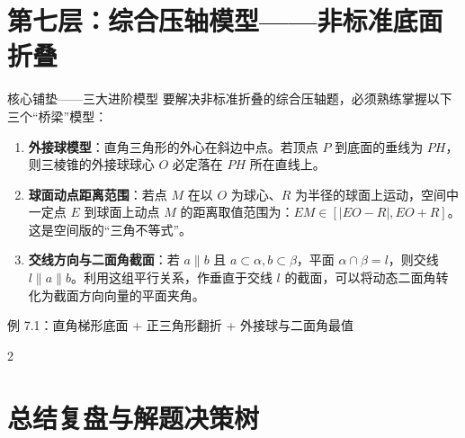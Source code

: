 \documentclass[11pt,a4paper]{ctexart}
\begin{document}
\newpage

\section{第七层：综合压轴模型——非标准底面折叠}

\begin{keybox}{核心铺垫——三大进阶模型}
要解决非标准折叠的综合压轴题，必须熟练掌握以下三个“桥梁”模型：
\begin{enumerate}[label=\arabic*., leftmargin=2em, itemsep=0.1em]
  \item \textbf{外接球模型}：直角三角形的外心在斜边中点。若顶点 $P$ 到底面的垂线为 $PH$，则三棱锥的外接球球心 $O$ 必定落在 $PH$ 所在直线上。
  \item \textbf{球面动点距离范围}：若点 $M$ 在以 $O$ 为球心、$R$ 为半径的球面上运动，空间中一定点 $E$ 到球面上动点 $M$ 的距离取值范围为：$EM \in [|EO-R|, EO+R]$。这是空间版的“三角不等式”。
  \item \textbf{交线方向与二面角截面}：若 $a \parallel b$ 且 $a \subset \alpha, b \subset \beta$，平面 $\alpha \cap \beta = l$，则交线 $l \parallel a \parallel b$。利用这组平行关系，作垂直于交线 $l$ 的截面，可以将动态二面角转化为截面方向向量的平面夹角。
\end{enumerate}
\end{keybox}

\begin{exbox}{例 7.1：直角梯形底面 + 正三角形翻折 + 外接球与二面角最值}
  \qSolidFoldingPentagonMinAngleStem
  \par\addvspace{0.4em}{\centering
  \qSolidFoldingPentagonMinAngleFigure[0.9]
  \par}\addvspace{0.4em}
\end{exbox}

\begin{paracol}{2}
\switchcolumn
{}
\end{paracol}

\newpage

\section{总结复盘与解题决策树}
\end{document}

